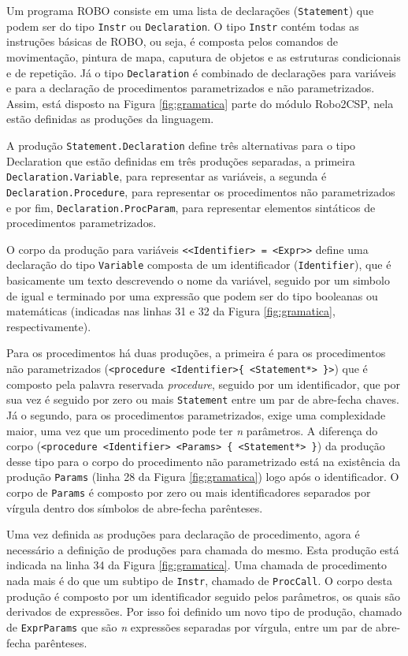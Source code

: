 Um programa ROBO consiste em uma lista de declarações (\texttt{Statement}) que podem ser do tipo \texttt{Instr} ou \texttt{Declaration}. O tipo \texttt{Instr} contém todas as instruções básicas de ROBO, ou seja, é composta pelos comandos de movimentação, pintura de mapa, caputura de objetos e as estruturas condicionais e de repetição. Já o tipo \texttt{Declaration} é combinado de declarações para variáveis e para a declaração de procedimentos parametrizados e não parametrizados. Assim, está disposto na Figura \ref{fig:gramatica} parte do módulo Robo2CSP, nela estão definidas as produções da linguagem.

A produção \texttt{Statement.Declaration} define três alternativas para o tipo Declaration que estão definidas em três produções separadas, a primeira \texttt{Declaration.Varia\-ble}, para representar as variáveis, a segunda é \texttt{Declaration.Procedure}, para representar os procedimentos não parametrizados e por fim, \texttt{Declaration.ProcParam}, para representar elementos sintáticos de procedimentos parametrizados.

O corpo da produção para variáveis \texttt{<<Identifier> = <Expr>>} define uma declaração do tipo \texttt{Variable} composta de um identificador (\texttt{Identifier}), que é basicamente um texto descrevendo o nome da variável, seguido por um simbolo de igual e terminado por uma expressão que podem ser do tipo booleanas ou matemáticas (indicadas nas linhas 31 e 32 da Figura \ref{fig:gramatica}, respectivamente).

Para os procedimentos há duas produções, a primeira é para os procedimentos não parametrizados (\texttt{<proce\-dure <Identifier>\{ <Statement*> \}>}) que é composto pela palavra reservada \textit{procedure}, seguido por um identificador, que por sua vez é seguido por zero ou mais \texttt{Statement} entre um par de abre-fecha chaves. Já o segundo, para os procedimentos parametrizados, exige uma complexidade maior, uma vez que um procedimento pode ter \textit{n} parâmetros. A diferença do corpo (\texttt{<procedure <Identifier> <Params> \{ <Statement*> \}}) da produção desse tipo para o corpo do procedimento não parametrizado está na existência da produção \texttt{Params} (linha 28 da Figura \ref{fig:gramatica}) logo após o identificador. O corpo de \texttt{Params} é composto por zero ou mais identificadores separados por vírgula dentro dos símbolos de abre-fecha parênteses.

Uma vez definida as produções para declaração de procedimento, agora é necessário a definição de produções para chamada do mesmo. Esta produção está indicada na linha 34 da Figura \ref{fig:gramatica}. Uma chamada de procedimento nada mais é do que um subtipo de \texttt{Instr}, chamado de \texttt{ProcCall}. O corpo desta produção é composto por um identificador seguido pelos parâmetros, os quais são derivados de expressões. Por isso foi definido um novo tipo de produção, chamado de \texttt{ExprParams} que são \textit{n} expressões separadas por vírgula, entre um par de abre-fecha parênteses.

